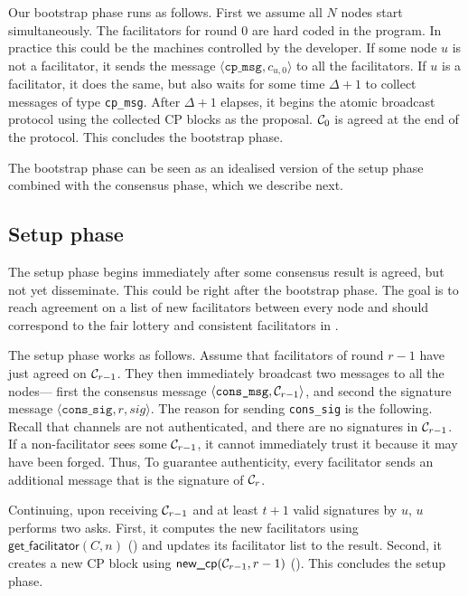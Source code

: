 Our bootstrap phase runs as follows.
First we assume all $N$ nodes start simultaneously.
The facilitators for round 0 are hard coded in the program.
In practice this could be the machines controlled by the developer.
If some node $u$ is not a facilitator,
it sends the message $\langle \texttt{cp\_msg}, c_{u, 0} \rangle$ to all the facilitators.
If $u$ is a facilitator, it does the same, but also waits for some time $\Delta + 1$ to collect messages of type \texttt{cp\_msg}.
After $\Delta + 1$ elapses, it begins the atomic broadcast protocol using the collected CP blocks as the proposal.
$\mathcal{C}_0$ is agreed at the end of the protocol.
This concludes the bootstrap phase.

The bootstrap phase can be seen as an idealised version of the setup phase combined with the consensus phase,
which we describe next.

\subsection{Setup phase}
The setup phase begins immediately after some consensus result is agreed, but not yet disseminate.
This could be right after the bootstrap phase.
The goal is to reach agreement on a list of new facilitators between every node
and should correspond to the fair lottery and consistent facilitators in .

The setup phase works as follows.
Assume that facilitators of round $r-1$ have just agreed on $\mathcal{C}_{r-1}$.
They then immediately broadcast two messages to all the nodes---
first the consensus message $\langle \texttt{cons\_msg}, \mathcal{C}_{r-1} \rangle$,
and second the signature message $\langle \texttt{cons\_sig}, r, sig \rangle$.
The reason for sending \texttt{cons\_sig} is the following.
Recall that channels are not authenticated, 
and there are no signatures in $\mathcal{C}_{r - 1}$.
If a non-facilitator sees some $\mathcal{C}_{r - 1}$, it cannot immediately trust it because it may have been forged.
Thus, To guarantee authenticity, every facilitator sends an additional message that is the signature of $\mathcal{C}_r$.

Continuing, upon receiving $\mathcal{C}_{r - 1}$ and at least $t + 1$ valid signatures by $u$, $u$ performs two asks.
First, it computes the new facilitators using $\textsf{get\_facilitator}(C, n)$ ()
and updates its facilitator list to the result.
Second, it creates a new CP block using $\textsf{new\_cp}(\mathcal{C}_{r - 1}, r - 1)$ ().
This concludes the setup phase.

